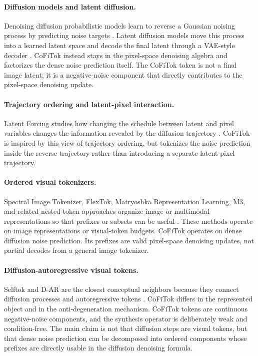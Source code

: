 \documentclass[letterpaper]{article}
\newcommand{\method}{CoFiTok}
\begin{document}
\paragraph{Diffusion models and latent diffusion.}
Denoising diffusion probabilistic models learn to reverse a Gaussian noising
process by predicting noise targets \citep{ho2020denoising}. Latent diffusion
models move this process into a learned latent space and decode the final latent
through a VAE-style decoder \citep{rombach2022latentdiffusion}. \method{}
instead stays in the pixel-space denoising algebra and factorizes the dense
noise prediction itself. The \method{} token is not a final image latent; it is a
negative-noise component that directly contributes to the pixel-space
denoising update.

\paragraph{Trajectory ordering and latent-pixel interaction.}
Latent Forcing studies how changing the schedule between latent and pixel
variables changes the information revealed by the diffusion trajectory
\citep{baade2026latentforcing}. \method{} is inspired by this view of trajectory
ordering, but tokenizes the noise prediction inside the reverse trajectory
rather than introducing a separate latent-pixel trajectory.

\paragraph{Ordered visual tokenizers.}
Spectral Image Tokenizer, FlexTok, Matryoshka Representation Learning, M3, and
related nested-token approaches organize image or multimodal representations so
that prefixes or subsets can be useful
\citep{esteves2025spectral,bachmann2025flextok,kusupati2024matryoshka,cai2024matryoshkamultimodal}.
These methods operate on image representations or visual-token budgets.
\method{} operates on dense diffusion noise prediction. Its prefixes are valid
pixel-space denoising updates, not partial decodes from a general image
tokenizer.

\paragraph{Diffusion-autoregressive visual tokens.}
Selftok and D-AR are the closest conceptual neighbors because they connect
diffusion processes and autoregressive tokens \citep{wang2025selftok,gao2025dar}.
\method{} differs in the represented object and in the anti-degeneration
mechanism. \method{} tokens are continuous negative-noise components,
and the synthesis operator is deliberately weak and condition-free. The main
claim is not that diffusion steps are visual tokens, but that dense noise
prediction can be decomposed into ordered components whose prefixes are directly
usable in the diffusion denoising formula.
\end{document}
